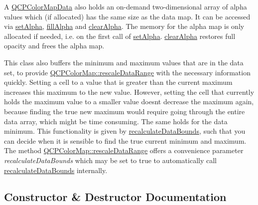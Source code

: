 A \hyperlink{classQCPColorMapData}{Q\+C\+P\+Color\+Map\+Data} also holds an on-\/demand two-\/dimensional array of alpha values which (if allocated) has the same size as the data map. It can be accessed via \hyperlink{classQCPColorMapData_aaf7de5b34c58f38d8f4c1ceb064a876c}{set\+Alpha}, \hyperlink{classQCPColorMapData_a93e2a549d7702bc849cd48a585294657}{fill\+Alpha} and \hyperlink{classQCPColorMapData_a14d08b9c3720cd719400079b86d3906b}{clear\+Alpha}. The memory for the alpha map is only allocated if needed, i.\+e. on the first call of \hyperlink{classQCPColorMapData_aaf7de5b34c58f38d8f4c1ceb064a876c}{set\+Alpha}. \hyperlink{classQCPColorMapData_a14d08b9c3720cd719400079b86d3906b}{clear\+Alpha} restores full opacity and frees the alpha map.

This class also buffers the minimum and maximum values that are in the data set, to provide \hyperlink{classQCPColorMap_a856608fa3dd1cc290bcd5f29a5575774}{Q\+C\+P\+Color\+Map\+::rescale\+Data\+Range} with the necessary information quickly. Setting a cell to a value that is greater than the current maximum increases this maximum to the new value. However, setting the cell that currently holds the maximum value to a smaller value doesn\textquotesingle{}t decrease the maximum again, because finding the true new maximum would require going through the entire data array, which might be time consuming. The same holds for the data minimum. This functionality is given by \hyperlink{classQCPColorMapData_ab235ade8a4d64bd3adb26a99b3dd57ee}{recalculate\+Data\+Bounds}, such that you can decide when it is sensible to find the true current minimum and maximum. The method \hyperlink{classQCPColorMap_a856608fa3dd1cc290bcd5f29a5575774}{Q\+C\+P\+Color\+Map\+::rescale\+Data\+Range} offers a convenience parameter {\itshape recalculate\+Data\+Bounds} which may be set to true to automatically call \hyperlink{classQCPColorMapData_ab235ade8a4d64bd3adb26a99b3dd57ee}{recalculate\+Data\+Bounds} internally. 

\subsection{Constructor \& Destructor Documentation}
